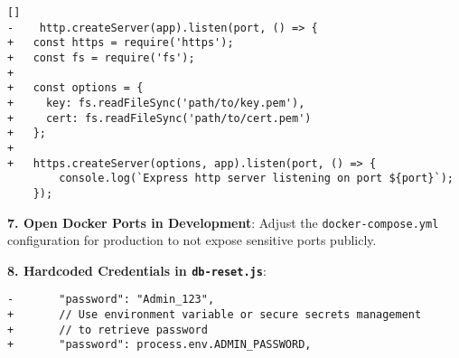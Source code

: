   \begin{framed}\scriptsize
  \begin{verbatim}[]
-    http.createServer(app).listen(port, () => {
+   const https = require('https');
+   const fs = require('fs');
+
+   const options = {
+     key: fs.readFileSync('path/to/key.pem'),
+     cert: fs.readFileSync('path/to/cert.pem')
+   };
+
+   https.createServer(options, app).listen(port, () => {
        console.log(`Express http server listening on port ${port}`);
    });
  \end{verbatim}
  \end{framed}
  
  \textbf{7. Open Docker Ports in Development}: Adjust the
  \texttt{docker-compose.yml} configuration for production to not expose
  sensitive ports publicly.
  
  \textbf{8. Hardcoded Credentials in \texttt{db-reset.js}}:
  
  \begin{framed}\scriptsize
  \begin{verbatim}
-       "password": "Admin_123",
+       // Use environment variable or secure secrets management 
+       // to retrieve password
+       "password": process.env.ADMIN_PASSWORD,
  \end{verbatim}
  \end{framed}
  
